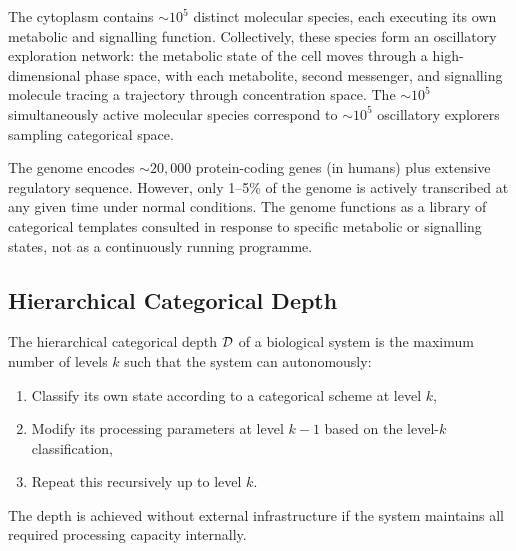 \begin{definition}
\label{v:def:tier2}
The cytoplasm contains $\sim\!10^5$ distinct molecular species, each executing its own metabolic and signalling function. Collectively, these species form an oscillatory exploration network: the metabolic state of the cell moves through a high-dimensional phase space, with each metabolite, second messenger, and signalling molecule tracing a trajectory through concentration space. The $\sim\!10^5$ simultaneously active molecular species correspond to $\sim\!10^5$ oscillatory explorers sampling categorical space.
\end{definition}

\begin{definition}
\label{v:def:tier3}
The genome encodes $\sim\!20,000$ protein-coding genes (in humans) plus extensive regulatory sequence. However, only 1--5\% of the genome is actively transcribed at any given time under normal conditions. The genome functions as a library of categorical templates consulted in response to specific metabolic or signalling states, not as a continuously running programme.
\end{definition}

\subsection{Hierarchical Categorical Depth}

\begin{definition}
\label{v:def:depth}
The hierarchical categorical depth $\mathcal{D}$ of a biological system is the maximum number of levels $k$ such that the system can autonomously:
\begin{enumerate}[(1)]
  \item Classify its own state according to a categorical scheme at level $k$,
  \item Modify its processing parameters at level $k-1$ based on the level-$k$ classification,
  \item Repeat this recursively up to level $k$.
\end{enumerate}
The depth is achieved without external infrastructure if the system maintains all required processing capacity internally.
\end{definition}

